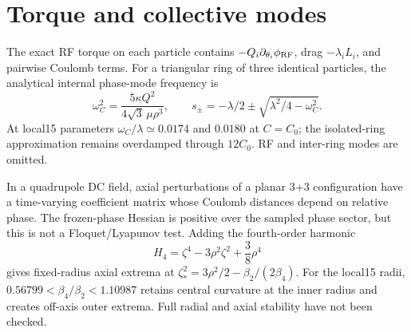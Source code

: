 \documentclass[11pt,a4paper]{article}
\begin{document}
\section{Torque and collective modes}
The exact RF torque on each particle contains \(-Q_i\partial_{\theta_i}\phi_{\rm RF}\), drag \(-\lambda_iL_i\), and pairwise Coulomb terms. For a triangular ring of three identical particles, the analytical internal phase-mode frequency is
\begin{equation}
\omega_C^2=\frac{5\kappa Q^2}{4\sqrt3\,\mu\rho^3},\qquad
s_\pm=-\lambda/2\pm\sqrt{\lambda^2/4-\omega_C^2}.
\end{equation}
At local15 parameters \(\omega_C/\lambda\simeq0.0174\) and \(0.0180\) at \(C=C_0\); the isolated-ring approximation remains overdamped through \(12C_0\). RF and inter-ring modes are omitted.

In a quadrupole DC field, axial perturbations of a planar 3+3 configuration have a time-varying coefficient matrix whose Coulomb distances depend on relative phase. The frozen-phase Hessian is positive over the sampled phase sector, but this is not a Floquet/Lyapunov test. Adding the fourth-order harmonic
\begin{equation}
H_4=\zeta^4-3\rho^2\zeta^2+\frac38\rho^4
\end{equation}
gives fixed-radius axial extrema at \(\zeta_*^2=3\rho^2/2-\beta_2/(2\beta_4)\). For the local15 radii, \(0.56799<\beta_4/\beta_2<1.10987\) retains central curvature at the inner radius and creates off-axis outer extrema. Full radial and axial stability have not been checked.
\end{document}
